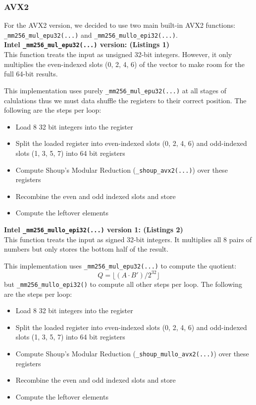 \documentclass{article}
\begin{document}
\subsubsection{AVX2}
For the AVX2 version, we decided to use two main built-in AVX2 functions:
\texttt{\_mm256\_mul\_epu32(...)} and \texttt{\_mm256\_mullo\_epi32(...)}. \\

\textbf{Intel \texttt{\_mm256\_mul\_epu32(...)} version: (Listings 1)} \\
This function treats the input as unsigned 32-bit integers. However, it only multiplies the even-indexed slots (0, 2, 4, 6) of the vector to make room for the full 64-bit results.

This implementation uses purely \texttt{\_mm256\_mul\_epu32(...)} at all stages of calulations thus we must data shuffle the registers to their correct position. The following are the steps per loop:

\begin{itemize}
    \item Load 8 32 bit integers into the register
    \item Split the loaded register into even-indexed slots (0, 2, 4, 6) and odd-indexed slots (1, 3, 5, 7) into 64 bit registers
    \item Compute Shoup's Modular Reduction (\texttt{\_shoup\_avx2(...)}) over these registers
    \item Recombine the even and odd indexed slots and store
    \item Compute the leftover elements
\end{itemize}

\textbf{Intel \texttt{\_mm256\_mullo\_epi32(...)} version 1: (Listings 2)} \\
This function treats the input as signed 32-bit integers. It multiplies all 8 pairs of numbers but only stores the bottom half of the result.

This implementation uses \texttt{\_mm256\_mul\_epu32(...)} to compute the quotient:
\[Q = \lfloor (A \cdot B') / 2^{32} \rfloor\]
but \texttt{\_mm256\_mullo\_epi32()} to compute all other steps per loop. The following are the steps per loop:
\begin{itemize}
    \item Load 8 32 bit integers into the register
    \item Split the loaded register into even-indexed slots (0, 2, 4, 6) and odd-indexed slots (1, 3, 5, 7) into 64 bit registers
    \item Compute Shoup's Modular Reduction (\texttt{\_shoup\_mullo\_avx2(...)}) over these registers
    \item Recombine the even and odd indexed slots and store
    \item Compute the leftover elements
\end{itemize}
\end{document}
